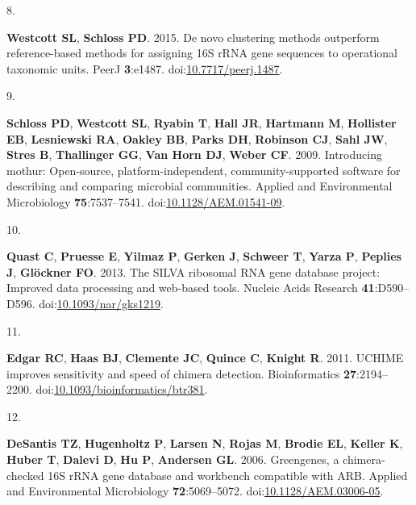 \documentclass[
]{article}
\newlength{\cslhangindent}
\newlength{\csllabelwidth}
\newlength{\cslentryspacingunit} %
\newenvironment{CSLReferences}[2] %
 {%
  \setlength{\parindent}{0pt}
  \ifodd #1
  \let\oldpar\par
  \def\par{\hangindent=\cslhangindent\oldpar}
  \fi
  \setlength{\parskip}{#2\cslentryspacingunit}
 }%
 {}
\newcommand{\CSLLeftMargin}[1]{\parbox[t]{\csllabelwidth}{#1}}
\newcommand{\CSLRightInline}[1]{\parbox[t]{\linewidth - \csllabelwidth}{#1}\break}
\begin{document}
\begin{CSLReferences}{0}{1}
\leavevmode{}%
\CSLLeftMargin{8. }%
\CSLRightInline{\textbf{Westcott SL}, \textbf{Schloss PD}. 2015. De novo
clustering methods outperform reference-based methods for assigning 16S
rRNA gene sequences to operational taxonomic units. PeerJ
\textbf{3}:e1487.
doi:\href{https://doi.org/10.7717/peerj.1487}{10.7717/peerj.1487}.}

\leavevmode{}%
\CSLLeftMargin{9. }%
\CSLRightInline{\textbf{Schloss PD}, \textbf{Westcott SL},
\textbf{Ryabin T}, \textbf{Hall JR}, \textbf{Hartmann M},
\textbf{Hollister EB}, \textbf{Lesniewski RA}, \textbf{Oakley BB},
\textbf{Parks DH}, \textbf{Robinson CJ}, \textbf{Sahl JW}, \textbf{Stres
B}, \textbf{Thallinger GG}, \textbf{Van Horn DJ}, \textbf{Weber CF}.
2009. Introducing mothur: Open-source, platform-independent,
community-supported software for describing and comparing microbial
communities. Applied and Environmental Microbiology
\textbf{75}:7537--7541.
doi:\href{https://doi.org/10.1128/AEM.01541-09}{10.1128/AEM.01541-09}.}

\leavevmode{}%
\CSLLeftMargin{10. }%
\CSLRightInline{\textbf{Quast C}, \textbf{Pruesse E}, \textbf{Yilmaz P},
\textbf{Gerken J}, \textbf{Schweer T}, \textbf{Yarza P}, \textbf{Peplies
J}, \textbf{Glöckner FO}. 2013. The SILVA ribosomal RNA gene database
project: Improved data processing and web-based tools. Nucleic Acids
Research \textbf{41}:D590--D596.
doi:\href{https://doi.org/10.1093/nar/gks1219}{10.1093/nar/gks1219}.}

\leavevmode{}%
\CSLLeftMargin{11. }%
\CSLRightInline{\textbf{Edgar RC}, \textbf{Haas BJ}, \textbf{Clemente
JC}, \textbf{Quince C}, \textbf{Knight R}. 2011. UCHIME improves
sensitivity and speed of chimera detection. Bioinformatics
\textbf{27}:2194--2200.
doi:\href{https://doi.org/10.1093/bioinformatics/btr381}{10.1093/bioinformatics/btr381}.}

\leavevmode{}%
\CSLLeftMargin{12. }%
\CSLRightInline{\textbf{DeSantis TZ}, \textbf{Hugenholtz P},
\textbf{Larsen N}, \textbf{Rojas M}, \textbf{Brodie EL}, \textbf{Keller
K}, \textbf{Huber T}, \textbf{Dalevi D}, \textbf{Hu P}, \textbf{Andersen
GL}. 2006. Greengenes, a chimera-checked 16S rRNA gene database and
workbench compatible with ARB. Applied and Environmental Microbiology
\textbf{72}:5069--5072.
doi:\href{https://doi.org/10.1128/AEM.03006-05}{10.1128/AEM.03006-05}.}


\end{CSLReferences}
\end{document}
